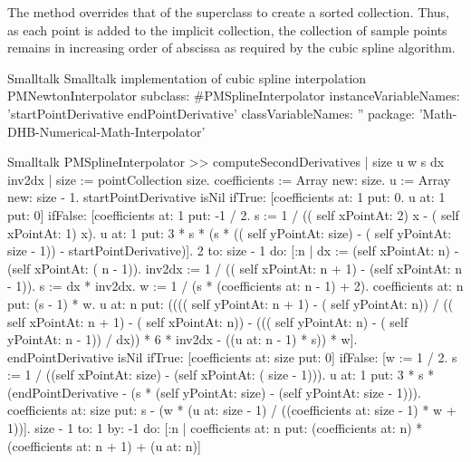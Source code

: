 The method  overrides that of the
superclass to create a sorted collection. Thus, as each point is
added to the implicit collection, the collection of sample points
remains in increasing order of abscissa as required by the cubic
spline algorithm.

\begin{listing}[label=lst:spline]{Smalltalk}
{Smalltalk implementation of cubic spline interpolation}
PMNewtonInterpolator subclass: #PMSplineInterpolator
   instanceVariableNames: 'startPointDerivative endPointDerivative'
   classVariableNames: ''
   package: 'Math-DHB-Numerical-Math-Interpolator'
\end{listing}

\begin{displaycode}{Smalltalk}
PMSplineInterpolator >> computeSecondDerivatives
    | size u w s dx inv2dx |
    size := pointCollection size.
    coefficients := Array new: size.
    u := Array new: size - 1.
    startPointDerivative isNil 
        ifTrue: 
            [coefficients at: 1 put: 0.
            u at: 1 put: 0]
        ifFalse: 
            [coefficients at: 1 put: -1 / 2.
            s := 1 / (( self xPointAt: 2) x - ( self xPointAt: 1) x).
            u at: 1
                put: 3 * s 
                        * (s * (( self yPointAt: size) - ( self 
                                                 yPointAt: size - 1)) 
                                - startPointDerivative)].
    2 to: size - 1
        do: 
            [:n | 
            dx := (self xPointAt: n) - (self xPointAt: ( n - 1)).
            inv2dx := 1 / (( self xPointAt: n + 1) - (self xPointAt: 
                                                              n - 1)).
            s := dx * inv2dx.
            w := 1 / (s * (coefficients at: n - 1) + 2).
            coefficients at: n put: (s - 1) * w.
            u at: n
                put: (((( self yPointAt: n + 1) - ( self yPointAt: 
                                                                  n)) 
                        / (( self xPointAt: n + 1) - ( self xPointAt: 
                                                                  n)) 
                            - ((( self yPointAt: n) - ( self 
                                         yPointAt: n - 1)) / dx)) * 6 
                        * inv2dx - ((u at: n - 1) * s)) 
                        * w].
    endPointDerivative isNil 
        ifTrue: [coefficients at: size put: 0]
        ifFalse: 
            [w := 1 / 2.
            s := 1 / ((self xPointAt:  size) - (self xPointAt: ( size 
                                                               - 1))).
            u at: 1
                put: 3 * s * (endPointDerivative 
                                - (s * (self yPointAt: size) - (self 
                                                yPointAt: size - 1))).
            coefficients at: size
                put: s - (w * (u at: size - 1) / ((coefficients at: 
                                                 size - 1) * w + 1))].
    size - 1 to: 1
        by: -1
        do: 
            [:n | 
            coefficients at: n
                put: (coefficients at: n) * (coefficients at: n + 1) 
                                                          + (u at: n)]


\end{displaycode}
